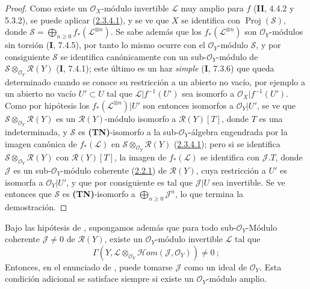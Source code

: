 \begin{proof}
Como existe un $\mathcal O_X$-módulo invertible $\mathcal L$ muy amplio para $f$ (\textbf{II}, 4.4.2 y 5.3.2), se puede aplicar (\hyperref[III.2.3.4.1-fr]{2.3.4.1}), y se ve que $X$ se identifica con $\operatorname{Proj}(\mathcal S)$, donde $\mathcal S=\bigoplus_{n\geq0}f_*(\mathcal L^{\otimes n})$. Se sabe además que los $f_*(\mathcal L^{\otimes n})$ son $\mathcal O_Y$-módulos sin torsión (\textbf{I}, 7.4.5), por tanto lo mismo ocurre con el $\mathcal O_Y$-módulo $\mathcal S$, y por consiguiente $\mathcal S$ se identifica canónicamente con un sub-$\mathcal O_Y$-módulo de $\mathcal S\otimes_{\mathcal O_Y}\mathcal R(Y)$ (\textbf{I}, 7.4.1); este último es un haz \emph{simple} (\textbf{I}, 7.3.6) que queda determinado cuando se conoce su restricción a un abierto no vacío, por ejemplo a un abierto no vacío $U'\subset U$ tal que $\mathcal L|f^{-1}(U')$ sea isomorfo a $\mathcal O_X|f^{-1}(U')$. Como por hipótesis los $f_*(\mathcal L^{\otimes n})|U'$ son entonces isomorfos a $\mathcal O_Y|U'$, se ve que $\mathcal S\otimes_{\mathcal O_Y}\mathcal R(Y)$ es un $\mathcal R(Y)$-módulo isomorfo a $\mathcal R(Y)[T]$, donde $T$ es una indeterminada, y $\mathcal S$ es \textbf{(TN)}-isomorfo a la sub-$\mathcal O_Y$-álgebra engendrada por la imagen canónica de $f_*(\mathcal L)$ en $\mathcal S\otimes_{\mathcal O_Y}\mathcal R(Y)$ (\hyperref[III.2.3.4.1-fr]{2.3.4.1}); pero si se identifica $\mathcal S\otimes_{\mathcal O_Y}\mathcal R(Y)$ con $\mathcal R(Y)[T]$, la imagen de $f_*(\mathcal L)$ se identifica con $\mathcal J.T$, donde $\mathcal J$ es un sub-$\mathcal O_Y$-módulo coherente (\hyperref[III.2.2.1-fr]{2.2.1}) de $\mathcal R(Y)$, cuya restricción a $U'$ es isomorfa a $\mathcal O_Y|U'$, y que por consiguiente es tal que $\mathcal J|U$ sea invertible. Se ve entonces que $\mathcal S$ es \textbf{(TN)}-isomorfo a $\bigoplus_{n\geq0}\mathcal J^n$, lo que termina la demostración.
\end{proof}

\begin{corollary}[2.3.6]
\label{III.2.3.6}
\label{III.2.3.6-fr}
Bajo las hipótesis de \textup{}, supongamos además que para todo sub-$\mathcal O_Y$-Módulo coherente
$\mathcal J\neq0$ de $\mathcal R(Y)$, existe un
$\mathcal O_Y$-módulo invertible $\mathcal L$ tal que
\[
\Gamma(Y,\mathcal L\otimes_{\mathcal O_Y}
\mathcal{H}om(\mathcal J,\mathcal O_Y))\neq0~;
\]
Entonces, en el enunciado de \textup{}, puede tomarse $\mathcal J$ como un ideal de $\mathcal O_Y$.
Esta condición adicional se satisface siempre si existe un $\mathcal O_Y$-módulo amplio.
\end{corollary}


